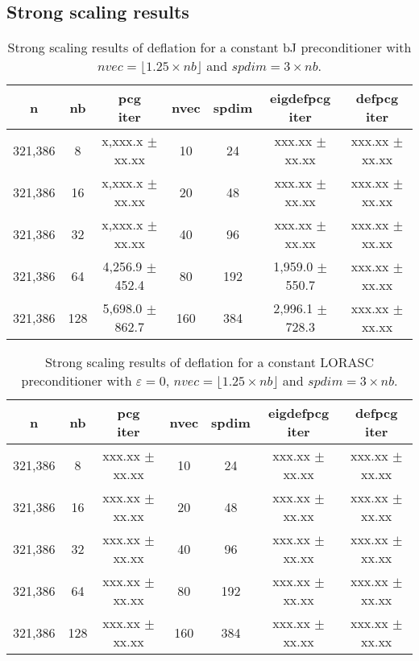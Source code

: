 \documentclass{article}
\begin{document}
\subsection{Strong scaling results}


\begin{table}[ht]
	\caption{Strong scaling results of deflation for a constant bJ preconditioner with $nvec=\lfloor1.25\times nb\rfloor$ and $spdim=3\times nb$.}
	\centering
	\begin{tabular}{|c|c|c|c|c|c|c|}
		\hline
		n & nb & \makecell{pcg\\ iter} & nvec & spdim & \makecell{eigdefpcg\\ iter} & \makecell{defpcg\\ iter}\\
		\hline
		321,386 &   8 & x,xxx.x $\pm$ xx.xx &  10 &  24 & xxx.xx $\pm$ xx.xx & xxx.xx $\pm$ xx.xx \\
        321,386 &  16 & x,xxx.x $\pm$ xx.xx &  20 &  48 & xxx.xx $\pm$ xx.xx & xxx.xx $\pm$ xx.xx \\
        321,386 &  32 & x,xxx.x $\pm$ xx.xx &  40 &  96 & xxx.xx $\pm$ xx.xx & xxx.xx $\pm$ xx.xx \\
        321,386 &  64 & 4,256.9 $\pm$ 452.4 &  80 & 192 & 1,959.0 $\pm$ 550.7 & xxx.xx $\pm$ xx.xx \\
		321,386 & 128 & 5,698.0 $\pm$ 862.7 & 160 & 384 & 2,996.1 $\pm$ 728.3 & xxx.xx $\pm$ xx.xx \\
		\hline
	\end{tabular}
	\label{Tab:030}
\end{table}


\begin{table}[ht]
	\caption{Strong scaling results of deflation for a constant LORASC preconditioner with $\varepsilon=0$, $nvec=\lfloor1.25\times nb\rfloor$ and $spdim=3\times nb$.}
	\centering
	\begin{tabular}{|c|c|c|c|c|c|c|}
		\hline
		n & nb & \makecell{pcg\\ iter} & nvec & spdim & \makecell{eigdefpcg\\ iter} & \makecell{defpcg\\ iter}\\
		\hline
		321,386 &   8 & xxx.xx $\pm$ xx.xx &  10 &  24 & xxx.xx $\pm$ xx.xx & xxx.xx $\pm$ xx.xx \\
		321,386 &  16 & xxx.xx $\pm$ xx.xx &  20 &  48 & xxx.xx $\pm$ xx.xx & xxx.xx $\pm$ xx.xx \\
		321,386 &  32 & xxx.xx $\pm$ xx.xx &  40 &  96 & xxx.xx $\pm$ xx.xx & xxx.xx $\pm$ xx.xx \\
		321,386 &  64 & xxx.xx $\pm$ xx.xx &  80 & 192 & xxx.xx $\pm$ xx.xx & xxx.xx $\pm$ xx.xx \\
		321,386 & 128 & xxx.xx $\pm$ xx.xx & 160 & 384 & xxx.xx $\pm$ xx.xx & xxx.xx $\pm$ xx.xx \\
		\hline
	\end{tabular}
	\label{Tab:035}
\end{table}
\end{document}
